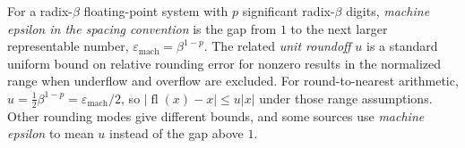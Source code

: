 
For a radix-$\beta$ floating-point system with $p$ significant radix-$\beta$ digits, \emph{machine epsilon in the spacing convention} is the gap from $1$ to the next larger representable number, $\varepsilon_{\mathrm{mach}}=\beta^{1-p}$. The related \emph{unit roundoff} $u$ is a standard uniform bound on relative rounding error for nonzero results in the normalized range when underflow and overflow are excluded. For round-to-nearest arithmetic, $u=\frac12\beta^{1-p}=\varepsilon_{\mathrm{mach}}/2$, so $|\operatorname{fl}(x)-x|\le u|x|$ under those range assumptions. Other rounding modes give different bounds, and some sources use \emph{machine epsilon} to mean $u$ instead of the gap above $1$.
